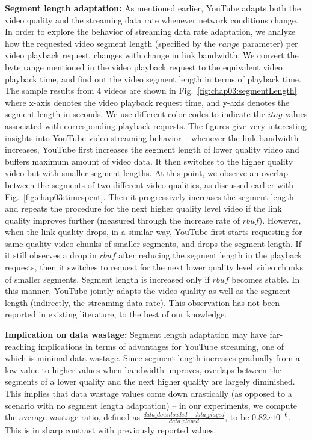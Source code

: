{\bf Segment length adaptation:} As mentioned earlier, YouTube adapts both the video quality and the streaming data rate whenever network conditions change.
In order to explore the behavior of streaming data rate adaptation, we analyze how the requested video segment length (specified by the $range$ parameter) per video playback request, changes with change in link bandwidth.
We convert the byte range mentioned in the video playback request to the equivalent video playback time, and find out the video segment length in terms of playback time.
The sample results from $4$ videos are shown in Fig.~\ref{fig:chap03:segmentLength} where x-axis denotes the video playback request time, and y-axis denotes the segment length in seconds.
We use different color codes to indicate the $itag$ values associated with corresponding playback requests.
The figures give very interesting insights into YouTube video streaming behavior -- whenever the link bandwidth increases, YouTube first increases the segment length of lower quality video and buffers maximum amount of video data.
It then switches to the higher quality video but with smaller segment lengths.
At this point, we observe an overlap between the segments of two different video qualities, as discussed earlier with Fig.~\ref{fig:chap03:timespent}.
Then it progressively increases the segment length and repeats the procedure for the next higher quality level video if the link quality improves further (measured through the increase rate of $rbuf$).
However, when the link quality drops, in a similar way, YouTube first starts requesting for same quality video chunks of smaller segments, and drops the segment length.
If it still observes a drop in $rbuf$ after reducing the segment length in the playback requests, then it switches to request for the next lower quality level video chunks of smaller segments.
Segment length is increased only if $rbuf$ becomes stable.
In this manner, YouTube jointly adapts the video quality as well as the segment length (indirectly, the streaming data rate).
This observation has not been reported in existing literature, to the best of our knowledge.

{\bf Implication on data wastage:} Segment length adaptation may have far-reaching implications in terms of advantages for YouTube streaming, one of which is minimal data wastage.
Since segment length increases gradually from a low value to higher values when bandwidth improves, overlaps between the segments of a lower quality and the next higher quality are largely diminished.
This implies that data wastage values come down drastically (as opposed to a scenario with no segment length adaptation) -- in our experiments, we compute the average wastage ratio, defined as $\frac{data\_downloaded - data\_played}{data\_played}$, to be $0.82 x 10^{-6}$.
This is in sharp contrast with previously reported values. 


